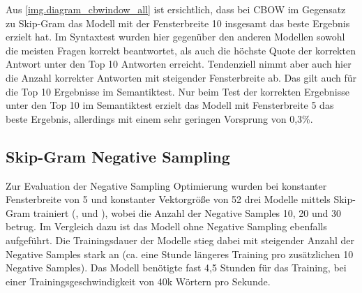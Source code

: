 Aus \autoref{img.diagram_cbwindow_all} ist ersichtlich, dass bei CBOW im Gegensatz zu Skip-Gram das Modell  mit der Fensterbreite 10 insgesamt das beste Ergebnis erzielt hat.
Im Syntaxtest wurden hier gegenüber den anderen Modellen sowohl die meisten Fragen korrekt beantwortet, als auch die höchste Quote der korrekten Antwort unter den Top 10 Antworten erreicht. Tendenziell nimmt aber auch hier die Anzahl korrekter Antworten mit steigender Fensterbreite ab.
Das gilt auch für die Top 10 Ergebnisse im Semantiktest. Nur beim Test der korrekten Ergebnisse unter den Top 10 im Semantiktest erzielt das Modell mit Fensterbreite 5 das beste Ergebnis, allerdings mit einem sehr geringen Vorsprung von 0,3\%.

\subsection{Skip-Gram Negative Sampling}
Zur Evaluation der Negative Sampling Optimierung wurden bei konstanter Fensterbreite von 5 und konstanter Vektorgröße von 52 drei Modelle mittels Skip-Gram trainiert (,  und ), wobei die Anzahl der Negative Samples 10, 20 und 30 betrug. Im Vergleich dazu ist das Modell  ohne Negative Sampling ebenfalls aufgeführt. Die Trainingsdauer der Modelle stieg dabei mit steigender Anzahl der Negative Samples stark an (ca. eine Stunde längeres Training pro zusätzlichen 10 Negative Samples). Das Modell  benötigte fast 4,5 Stunden für das Training, bei einer Trainingsgeschwindigkeit von 40k Wörtern pro Sekunde.

